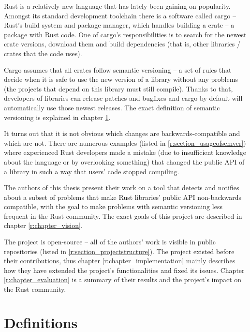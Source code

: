 \documentclass[licencjacka,en]{pracamgr}
\begin{document}
Rust is a relatively new language that has lately been gaining on popularity.
Amongst its standard development toolchain there is a software called cargo
-- Rust's build system and package manager,
which handles building a crate -- a package with Rust code.
One of cargo's responsibilities is to search for the newest crate versions,
download them and build dependencies
(that is, other libraries / crates that the code uses).

Cargo assumes that all crates follow semantic versioning
-- a set of rules that decide when it is safe to use the new version of a library
without any problems (the projects that depend on this library must still compile).
Thanks to that, developers of libraries can release patches and bugfixes
and cargo by default will automatically use those newest releases.
The exact definition of semantic versioning is explained in chapter \ref{r:chapter_definitions}.

It turns out that it is not obvious which changes are backwards-compatible
and which are not. There are numerous examples (listed in \ref{r:section_usageofsemver})
where experienced Rust developers made a mistake
(due to insufficient knowledge about the language or by overlooking something)
that changed the public API of a library in such a way that users' code stopped compiling.

The authors of this thesis present their work on a tool that detects and notifies about
a subset of problems that make Rust libraries' public API non-backwards compatible,
with the goal to make problems with semantic versioning less frequent in the Rust community.
The exact goals of this project are described in chapter \ref{r:chapter_vision}.

The project is open-source -- all of the authors' work is visible in public repositories
(listed in \ref{r:section_projectstructure}). The project existed before their contributions,
thus chapter \ref{r:chapter_implementation} mainly describes how they have
extended the project's functionalities and fixed its issues.
Chapter \ref{r:chapter_evaluation} is a summary of their results and the project's impact
on the Rust community.


\chapter{Definitions}\label{r:chapter_definitions}
\end{document}
